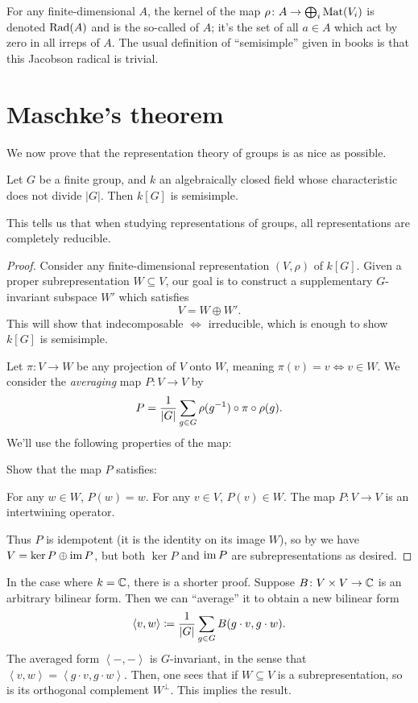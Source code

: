\begin{remark}
	[Digression]
	For any finite-dimensional $A$, the kernel of the map
	$\rho \colon A \to \bigoplus_i \mathrm{Mat}(V_i)$ is denoted $\operatorname{Rad}(A)$
	and is the so-called  of $A$;
	it's the set of all $a \in A$ which act by zero in all irreps of $A$.
	The usual definition of ``semisimple'' given in books is that
	this Jacobson radical is trivial.
\end{remark}

\section{Maschke's theorem}
We now prove that the representation theory of groups is as nice as possible.
\begin{theorem}
	Let $G$ be a finite group, and $k$ an algebraically closed
	field whose characteristic does not divide $|G|$.
	Then $k[G]$ is semisimple.
\end{theorem}
This tells us that when studying representations of groups,
all representations are completely reducible.
\begin{proof}
	Consider any finite-dimensional representation $(V, \rho)$ of $k[G]$.
	Given a proper subrepresentation $W \subseteq V$,
	our goal is to construct a supplementary $G$-invariant subspace $W'$
	which satisfies \[ V = W \oplus W'. \]
	This will show that indecomposable $\iff$ irreducible,
	which is enough to show $k[G]$ is semisimple.

	Let $\pi \colon V \to W$ be any projection of $V$ onto $W$,
	meaning $\pi(v) = v \iff v \in W$.
	We consider the \emph{averaging} map $P \colon V \to V$ by
	\[
		P = \frac{1}{\left\lvert G \right\rvert}
		\sum_{g \in G} \rho(g^{-1}) \circ \pi \circ \rho(g).
	\]
	We'll use the following properties of the map:
	\begin{exercise}
		Show that the map $P$ satisfies:
		\begin{itemize}
			\ii For any $w \in W$, $P(w) = w$.
			\ii For any $v \in V$, $P(v) \in W$.
			\ii The map $P \colon V \to V$ is an intertwining operator.
		\end{itemize}
	\end{exercise}
	Thus $P$ is idempotent (it is the identity on its image $W$),
	so by  we have $V = \ker P \oplus \operatorname{im} P$,
	but both $\ker P$ and $\operatorname{im} P$ are subrepresentations as desired.
\end{proof}
\begin{remark}
	In the case where $k = \mathbb C$, there is a shorter proof.
	Suppose $B \colon V \times V \to \mathbb C$ is an arbitrary bilinear form.
	Then we can ``average'' it to obtain a new bilinear form
	\[ \left< v,w \right> \coloneqq \frac{1}{|G|} \sum_{g \in G} B(g \cdot v, g \cdot w). \]
	The averaged form $\left< -,- \right>$ is $G$-invariant,
	in the sense that $\left< v,w \right> = \left< g \cdot v, g \cdot w\right>$.
	Then, one sees that if $W \subseteq V$ is a subrepresentation,
	so is its orthogonal complement $W^\perp$.
	This implies the result.
\end{remark}

